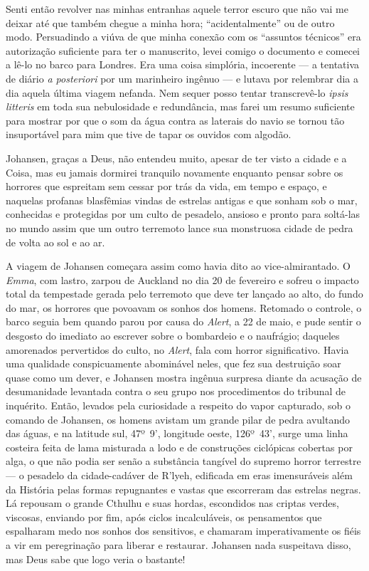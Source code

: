 Senti então revolver nas minhas entranhas aquele terror escuro que não
vai me deixar até que também chegue a minha hora; ``acidentalmente'' ou
de outro modo. Persuadindo a viúva de que minha conexão com os
``assuntos técnicos'' era autorização suficiente para ter o manuscrito,
levei comigo o documento e comecei a lê-lo no barco para Londres. Era
uma coisa simplória, incoerente --- a tentativa de diário \emph{a
posteriori} por um marinheiro ingênuo --- e lutava por relembrar
dia a dia aquela última viagem nefanda. Nem sequer posso tentar
transcrevê-lo \emph{ipsis litteris} em toda sua nebulosidade e
redundância, mas farei um resumo suficiente para mostrar por que o som
da água contra as laterais do navio se tornou tão insuportável para mim
que tive de tapar os ouvidos com algodão.

Johansen, graças a Deus, não entendeu muito, apesar de ter visto a
cidade e a Coisa, mas eu jamais dormirei tranquilo novamente enquanto
pensar sobre os horrores que espreitam sem cessar por trás da vida, em
tempo e espaço, e naquelas profanas blasfêmias vindas de estrelas
antigas e que sonham sob o mar, conhecidas e protegidas por um culto de
pesadelo, ansioso e pronto para soltá-las no mundo assim que um outro
terremoto lance sua monstruosa cidade de pedra de volta ao sol e ao ar.

A viagem de Johansen começara assim como havia dito ao vice-almirantado.
O \emph{Emma}, com lastro, zarpou de Auckland no dia 20 de fevereiro e
sofreu o impacto total da tempestade gerada pelo terremoto que deve ter
lançado ao alto, do fundo do mar, os horrores que povoavam os sonhos dos
homens. Retomado o controle, o barco seguia bem quando parou por causa
do \emph{Alert}, a 22 de maio, e pude sentir o desgosto do imediato ao
escrever sobre o bombardeio e o naufrágio; daqueles amorenados
pervertidos do culto, no \emph{Alert}, fala com horror significativo.
Havia uma qualidade conspicuamente abominável neles, que fez sua
destruição soar quase como um dever, e Johansen mostra ingênua surpresa
diante da acusação de desumanidade levantada contra o seu grupo nos
procedimentos do tribunal de inquérito. Então, levados pela curiosidade
a respeito do vapor capturado, sob o comando de Johansen, os homens
avistam um grande pilar de pedra avultando das águas, e na latitude sul,
47º~9', longitude oeste, 126º~43', surge uma linha costeira feita de
lama misturada a lodo e de construções ciclópicas cobertas por alga, o
que não podia ser senão a substância tangível do supremo horror
terrestre --- o pesadelo da cidade-cadáver de R'lyeh, edificada em eras
imensuráveis além da História pelas formas repugnantes e vastas que
escorreram das estrelas negras. Lá repousam o grande Cthulhu e suas
hordas, escondidos nas criptas verdes, viscosas, enviando por fim, após
ciclos incalculáveis, os pensamentos que espalharam medo nos sonhos dos
sensitivos, e chamaram imperativamente os fiéis a vir em peregrinação
para liberar e restaurar. Johansen nada suspeitava disso, mas Deus sabe
que logo veria o bastante!

